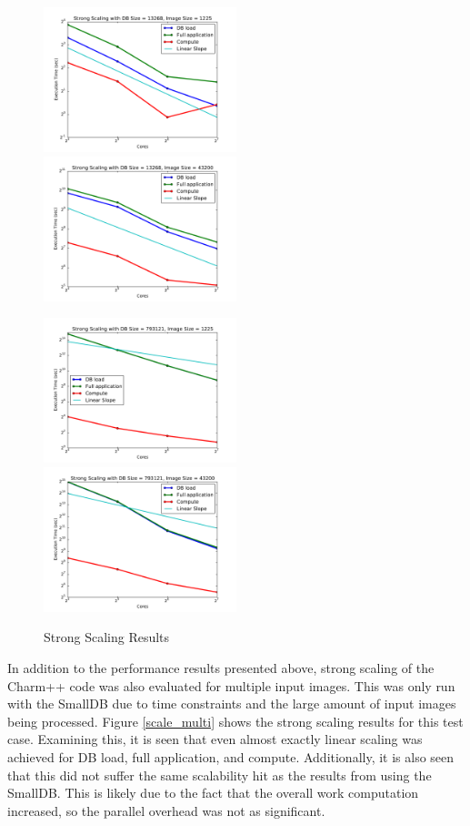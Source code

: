 \documentclass[a4paper]{article}
\begin{document}
\begin{figure}[ht!]
\centerline{%
\includegraphics[width=0.5\textwidth]{figs/13268_1225}%
\includegraphics[width=0.5\textwidth]{figs/13268_43200}%
}%
\centerline{%
\includegraphics[width=0.5\textwidth] {figs/793121_1225}%
\includegraphics[width=0.5\textwidth] {figs/793121_43200}%
}%
\caption{Strong Scaling Results}
\label{scalability}
\end{figure}

In addition to the performance results presented above, strong scaling of the Charm++ code was also evaluated for multiple input images.  This was only run with the SmallDB due to time constraints and the large amount of input images being processed.  Figure \ref{scale_multi} shows the strong scaling results for this test case.  Examining this, it is seen that even almost exactly linear scaling was achieved for DB load, full application, and compute.  Additionally, it is also seen that this did not suffer the same scalability hit as the results from using the SmallDB.  This is likely due to the fact that the overall work computation increased, so the parallel overhead was not as significant.
\end{document}
